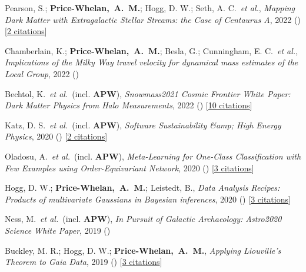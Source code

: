 \item[{\color{deemph}\scriptsize12}]Pearson, S.; \textbf{Price-Whelan,~A.~M.}; Hogg, D. W.; Seth, A. C.~\textit{et al.}, \textit{Mapping Dark Matter with Extragalactic Stellar Streams: the Case of Centaurus A}, 2022 () [\href{http://adsabs.harvard.edu/abs/2022arXiv220512277P}{2 citations}]

\item[{\color{deemph}\scriptsize11}]Chamberlain, K.; \textbf{Price-Whelan,~A.~M.}; Besla, G.; Cunningham, E. C.~\textit{et al.}, \textit{Implications of the Milky Way travel velocity for dynamical mass estimates of the Local Group}, 2022 ()

\item[{\color{deemph}\scriptsize10}]Bechtol, K.~\textit{et al.}~(incl. \textbf{APW}), \textit{Snowmass2021 Cosmic Frontier White Paper: Dark Matter Physics from Halo Measurements}, 2022 () [\href{http://adsabs.harvard.edu/abs/2022arXiv220307354B}{10 citations}]

\item[{\color{deemph}\scriptsize9}]Katz, D. S.~\textit{et al.}~(incl. \textbf{APW}), \textit{Software Sustainability {\&}amp; High Energy Physics}, 2020 () [\href{http://adsabs.harvard.edu/abs/2020arXiv201005102K}{2 citations}]

\item[{\color{deemph}\scriptsize8}]Oladosu, A.~\textit{et al.}~(incl. \textbf{APW}), \textit{Meta-Learning for One-Class Classification with Few Examples using Order-Equivariant Network}, 2020 () [\href{http://adsabs.harvard.edu/abs/2020arXiv200704459O}{3 citations}]

\item[{\color{deemph}\scriptsize7}]Hogg, D. W.; \textbf{Price-Whelan,~A.~M.}; Leistedt, B., \textit{Data Analysis Recipes: Products of multivariate Gaussians in Bayesian inferences}, 2020 () [\href{http://adsabs.harvard.edu/abs/2020arXiv200514199H}{3 citations}]

\item[{\color{deemph}\scriptsize6}]Ness, M.~\textit{et al.}~(incl. \textbf{APW}), \textit{In Pursuit of Galactic Archaeology: Astro2020 Science White Paper}, 2019 ()

\item[{\color{deemph}\scriptsize5}]Buckley, M. R.; Hogg, D. W.; \textbf{Price-Whelan,~A.~M.}, \textit{Applying Liouville's Theorem to Gaia Data}, 2019 () [\href{http://adsabs.harvard.edu/abs/2019arXiv190700987B}{3 citations}]

